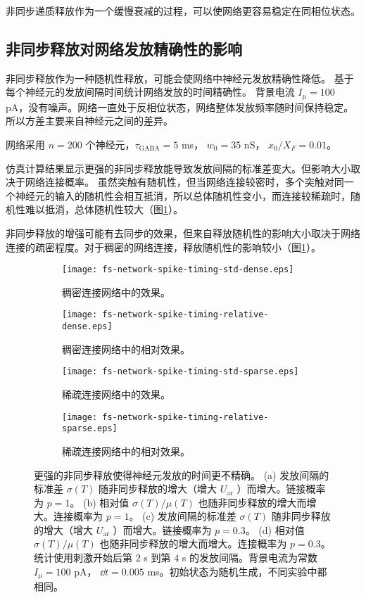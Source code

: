 非同步递质释放作为一个缓慢衰减的过程，可以使网络更容易稳定在同相位状态。

\subsection{非同步释放对网络发放精确性的影响}
\label{section:result:network-spike-timing}
非同步释放作为一种随机性释放，可能会使网络中神经元发放精确性降低。
基于每个神经元的发放间隔时间统计网络发放的时间精确性。
背景电流 $I_{\mu} = 100$ pA，没有噪声。网络一直处于反相位状态，网络整体发放频率随时间保持稳定。所以方差主要来自神经元之间的差异。

网络采用 $n = 200$ 个神经元，$\tau_\text{GABA} = 5$ ms， $w_0 = 35$ nS， $x_0 / X_F = 0.01$。

仿真计算结果显示更强的非同步释放能导致发放间隔的标准差变大。但影响大小取决于网络连接概率。
虽然突触有随机性，但当网络连接较密时，多个突触对同一个神经元的输入的随机性会相互抵消，所以总体随机性变小，而连接较稀疏时，随机性难以抵消，总体随机性较大（图\ref{figure:spike-timing-precision}）。

非同步释放的增强可能有去同步的效果，但来自释放随机性的影响大小取决于网络连接的疏密程度。对于稠密的网络连接，释放随机性的影响较小（图\ref{figure:spike-timing-precision}）。

\begin{figure}[H]
    \begin{subfigure}{0.5\textwidth}
        \texttt{[image: fs-network-spike-timing-std-dense.eps]}
        \caption{稠密连接网络中的效果。}
    \end{subfigure}
    \begin{subfigure}{0.5\textwidth}
        \texttt{[image: fs-network-spike-timing-relative-dense.eps]}
        \caption{稠密连接网络中的相对效果。}
    \end{subfigure}
    \begin{subfigure}{0.5\textwidth}
        \texttt{[image: fs-network-spike-timing-std-sparse.eps]}
        \caption{稀疏连接网络中的效果。}
    \end{subfigure}
    \begin{subfigure}{0.5\textwidth}
        \texttt{[image: fs-network-spike-timing-relative-sparse.eps]}
        \caption{稀疏连接网络中的相对效果。}
    \end{subfigure}
\caption{更强的非同步释放使得神经元发放的时间更不精确。
(a) 发放间隔的标准差 $\sigma(T)$ 随非同步释放的增大（增大 $U_\text{ar}$ ）而增大。链接概率为 $p = 1$。
(b) 相对值 $\sigma(T)/\mu(T)$ 也随非同步释放的增大而增大。连接概率为 $p = 1$。
(c) 发放间隔的标准差 $\sigma(T)$ 随非同步释放的增大（增大 $U_\text{ar}$ ）而增大。链接概率为 $p = 0.3$。
(d) 相对值 $\sigma(T)/\mu(T)$ 也随非同步释放的增大而增大。连接概率为 $p = 0.3$。
统计使用刺激开始后第 $2$ s 到第 $4$ s 的发放间隔。背景电流为常数 $I_{\mu} = 100$ pA， $\dd{t} = 0.005$ ms。初始状态为随机生成，不同实验中都相同。}
\label{figure:spike-timing-precision}
\end{figure}

